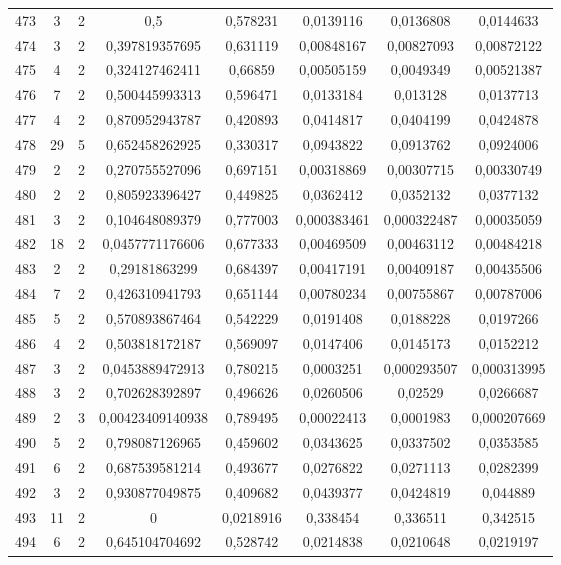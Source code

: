 \begin{longtable}{|c|c|c|c|c|c|c|c|}
473 & 3 & 2 & 0,5 & 0,578231 & 0,0139116 & 0,0136808 & 0,0144633  \\
474 & 3 & 2 & 0,397819357695 & 0,631119 & 0,00848167 & 0,00827093 & 0,00872122  \\
475 & 4 & 2 & 0,324127462411 & 0,66859 & 0,00505159 & 0,0049349 & 0,00521387  \\
476 & 7 & 2 & 0,500445993313 & 0,596471 & 0,0133184 & 0,013128 & 0,0137713  \\
477 & 4 & 2 & 0,870952943787 & 0,420893 & 0,0414817 & 0,0404199 & 0,0424878  \\
478 & 29 & 5 & 0,652458262925 & 0,330317 & 0,0943822 & 0,0913762 & 0,0924006  \\
479 & 2 & 2 & 0,270755527096 & 0,697151 & 0,00318869 & 0,00307715 & 0,00330749  \\
480 & 2 & 2 & 0,805923396427 & 0,449825 & 0,0362412 & 0,0352132 & 0,0377132  \\
481 & 3 & 2 & 0,104648089379 & 0,777003 & 0,000383461 & 0,000322487 & 0,00035059  \\
482 & 18 & 2 & 0,0457771176606 & 0,677333 & 0,00469509 & 0,00463112 & 0,00484218  \\
483 & 2 & 2 & 0,29181863299 & 0,684397 & 0,00417191 & 0,00409187 & 0,00435506  \\
484 & 7 & 2 & 0,426310941793 & 0,651144 & 0,00780234 & 0,00755867 & 0,00787006  \\
485 & 5 & 2 & 0,570893867464 & 0,542229 & 0,0191408 & 0,0188228 & 0,0197266  \\
486 & 4 & 2 & 0,503818172187 & 0,569097 & 0,0147406 & 0,0145173 & 0,0152212  \\
487 & 3 & 2 & 0,0453889472913 & 0,780215 & 0,0003251 & 0,000293507 & 0,000313995  \\
488 & 3 & 2 & 0,702628392897 & 0,496626 & 0,0260506 & 0,02529 & 0,0266687  \\
489 & 2 & 3 & 0,00423409140938 & 0,789495 & 0,00022413 & 0,0001983 & 0,000207669  \\
490 & 5 & 2 & 0,798087126965 & 0,459602 & 0,0343625 & 0,0337502 & 0,0353585  \\
491 & 6 & 2 & 0,687539581214 & 0,493677 & 0,0276822 & 0,0271113 & 0,0282399  \\
492 & 3 & 2 & 0,930877049875 & 0,409682 & 0,0439377 & 0,0424819 & 0,044889  \\
493 & 11 & 2 & 0 & 0,0218916 & 0,338454 & 0,336511 & 0,342515  \\
494 & 6 & 2 & 0,645104704692 & 0,528742 & 0,0214838 & 0,0210648 & 0,0219197  \\

\end{longtable}
